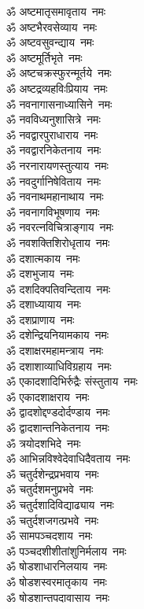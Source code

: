 \begin{multicols}{2}
\begin{flushleft}
ॐ अष्टमातृसमावृताय~नमः\\
ॐ अष्टभैरवसेव्याय~नमः\\
ॐ अष्टवसुवन्द्याय~नमः\\
ॐ अष्टमूर्तिभृते~नमः\\
ॐ अष्टचक्रस्फुरन्मूर्तये~नमः\hfill{}\\
ॐ अष्टद्रव्यहविःप्रियाय~नमः\\
ॐ नवनागासनाध्यासिने~नमः\\
ॐ नवविध्यनुशासित्रे~नमः\\
ॐ नवद्वारपुराधाराय~नमः\\
ॐ नवद्वारनिकेतनाय~नमः\\
ॐ नरनारायणस्तुत्याय~नमः\\
ॐ नवदुर्गानिषेविताय~नमः\\
ॐ नवनाथमहानाथाय~नमः\\
ॐ नवनागविभूषणाय~नमः\\
ॐ नवरत्नविचित्राङ्गाय~नमः\hfill{}\\
ॐ नवशक्तिशिरोधृताय~नमः\\
ॐ दशात्मकाय~नमः\\
ॐ दशभुजाय~नमः\\
ॐ दशदिक्पतिवन्दिताय~नमः\\
ॐ दशाध्यायाय~नमः\\
ॐ दशप्राणाय~नमः\\
ॐ दशेन्द्रियनियामकाय~नमः\\
ॐ दशाक्षरमहामन्त्राय~नमः\\
ॐ दशाशाव्याधिविग्रहाय~नमः\\
ॐ एकादशादिभिर्रुद्रैः संस्तुताय~नमः\hfill{}\\
ॐ एकादशाक्षराय~नमः\\
ॐ द्वादशोद्दण्डदोर्दण्डाय~नमः\\
ॐ द्वादशान्तनिकेतनाय~नमः\\
ॐ त्रयोदशभिदे~नमः\\
ॐ आभिन्नविश्वेदेवाधिदैवताय~नमः\\
ॐ चतुर्दशेन्द्रप्रभवाय~नमः\\
ॐ चतुर्दशमनुप्रभवे~नमः\\
ॐ चतुर्दशादिविद्याढ्याय~नमः\\
ॐ चतुर्दशजगत्प्रभवे~नमः\\
ॐ सामपञ्चदशाय~नमः\hfill{}\\
ॐ पञ्चदशीशीतांशुनिर्मलाय~नमः\\
ॐ षोडशाधारनिलयाय~नमः\\
ॐ षोडशस्वरमातृकाय~नमः\\
ॐ षोडशान्तपदावासाय~नमः\\

\end{flushleft}
\end{multicols}
